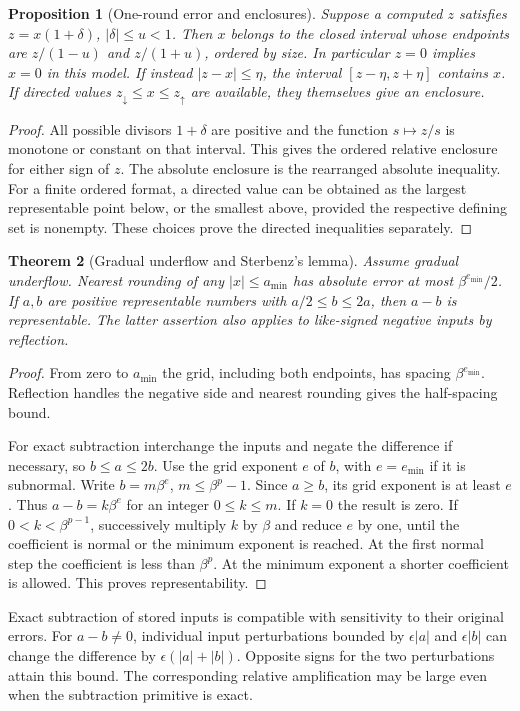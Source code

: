 \documentclass[11pt,oneside,openany]{book}
\theoremstyle{plain}
\newtheorem{theorem}{Theorem}[chapter]
\newtheorem{proposition}[theorem]{Proposition}
\theoremstyle{definition}
\theoremstyle{remark}
\begin{document}
\begin{proposition}[One-round error and enclosures]\label{p206:W03}
Suppose a computed \(z\) satisfies \(z=x(1+\delta)\),
\(|\delta|\le u<1\). Then \(x\) belongs to the closed interval
whose endpoints are \(z/(1-u)\) and \(z/(1+u)\), ordered by size.
In particular \(z=0\) implies \(x=0\) in this model. If instead
\(|z-x|\le\eta\), the interval \([z-\eta,z+\eta]\) contains \(x\).
If directed values \(z_\downarrow\le x\le z_\uparrow\)
are available, they themselves give an enclosure.
\end{proposition}
\begin{proof}
All possible divisors \(1+\delta\) are positive and the function
\(s\mapsto z/s\) is monotone or constant on that interval. This
gives the ordered relative enclosure for either sign of \(z\).
The absolute enclosure is the rearranged absolute inequality.
For a finite ordered format, a directed value can be obtained as
the largest representable point below, or the smallest above,
provided the respective defining set is nonempty. These choices
prove the directed inequalities separately.
\end{proof}

\begin{theorem}[Gradual underflow and Sterbenz's lemma]\label{p206:W04}
Assume gradual underflow. Nearest rounding of any \(|x|\le a_{\min}\)
has absolute error at most \(\beta^{e_{\min}}/2\).
If \(a,b\) are positive representable numbers with
\(a/2\le b\le2a\), then \(a-b\) is representable.
The latter assertion also applies to like-signed negative inputs
by reflection.
\end{theorem}
\begin{proof}
From zero to \(a_{\min}\) the grid, including both endpoints,
has spacing \(\beta^{e_{\min}}\). Reflection handles the
negative side and nearest rounding gives the half-spacing bound.

For exact subtraction interchange the inputs and negate the
difference if necessary, so \(b\le a\le2b\).
Use the grid exponent \(e\) of \(b\), with \(e=e_{\min}\) if it is
subnormal. Write \(b=m\beta^e\), \(m\le\beta^p-1\).
Since \(a\ge b\), its grid exponent is at least \(e\).
Thus \(a-b=k\beta^e\) for an integer \(0\le k\le m\).
If \(k=0\) the result is zero. If \(0<k<\beta^{p-1}\),
successively multiply \(k\) by \(\beta\) and reduce \(e\) by one,
until the coefficient is normal or the minimum exponent is reached.
At the first normal step the coefficient is less than \(\beta^p\).
At the minimum exponent a shorter coefficient is allowed.
This proves representability.
\end{proof}
Exact subtraction of stored inputs is compatible with sensitivity
to their original errors. For \(a-b\ne0\), individual input
perturbations bounded by \(\epsilon |a|\) and \(\epsilon |b|\)
can change the difference by \(\epsilon(|a|+|b|)\).
Opposite signs for the two perturbations attain this bound.
The corresponding relative amplification may be large even
when the subtraction primitive is exact.
\end{document}
